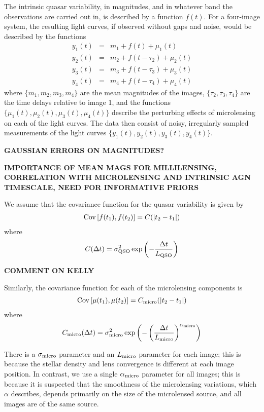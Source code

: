 \documentclass[useAMS,usenatbib, a4paper]{mn2e} \usepackage{natbib}
\begin{document}
The intrinsic quasar variability, in magnitudes, and in whatever band the
observations are carried out in, is described by a function $f(t)$. For a
four-image system, the resulting light curves, if observed without gaps and
noise, would be described by the functions
\begin{eqnarray}
y_1(t) &=& m_1 + f(t) + \mu_1(t) \\
y_2(t) &=& m_2 + f(t - \tau_2) + \mu_2(t) \\
y_3(t) &=& m_3 + f(t - \tau_3) + \mu_3(t) \\
y_4(t) &=& m_4 + f(t - \tau_4) + \mu_4(t) 
\end{eqnarray}
where $\{m_1, m_2, m_3, m_4\}$ are the mean magnitudes of the images,
$\{\tau_2, \tau_3, \tau_4\}$ are the time delays relative to image 1, and the
functions $\{\mu_1(t), \mu_2(t), \mu_3(t), \mu_4(t)\}$ describe the perturbing
effects of microlensing on each of the light curves. The data then consist of
noisy, irregularly sampled measurements of the light curves $\{y_1(t), y_2(t),
y_3(t), y_4(t)\}$.

{\bf GAUSSIAN ERRORS ON MAGNITUDES?}

{\bf IMPORTANCE OF MEAN MAGS FOR MILLILENSING, CORRELATION WITH MICROLENSING AND INTRINSIC AGN TIMESCALE, NEED FOR INFORMATIVE PRIORS}

We assume that the covariance function for the quasar variability is given by
\begin{eqnarray}
\textnormal{Cov}\left[f(t_1), f(t_2)\right] = C(|t_2 - t_1|)
\end{eqnarray}
where
\begin{eqnarray}
C(\Delta t) = \sigma_{\rm QSO}^2\exp\left(-\frac{\Delta t}{L_{\rm QSO}}\right)
\end{eqnarray}

{\bf COMMENT ON KELLY}

Similarly, the covariance function for each of the microlensing components is
\begin{eqnarray}
\textnormal{Cov}\left[\mu(t_1), \mu(t_2)\right] = C_{\rm micro}(|t_2 - t_1|)
\end{eqnarray}
where
\begin{eqnarray}
C_{\rm micro}(\Delta t) = \sigma_{\rm micro}^2\exp\left(-\left(\frac{\Delta t}{L_{\rm micro}}\right)^{\alpha_{\rm micro}}\right)
\end{eqnarray}

There is a $\sigma_{\rm micro}$  parameter and an $L_{\rm micro}$ parameter
for each image; this is because the stellar density and lens convergence is
different at each image position. In contrast, we use a single $\alpha_{\rm
micro}$ parameter for all images; this is because it is suspected that the
smoothness of the microlensing variations, which $\alpha$ describes, depends
primarily on the size of the microlensed source, and all images are of the
same source. 
\end{document}
